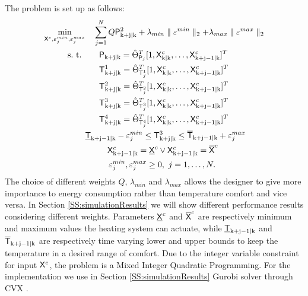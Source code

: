 The problem is set up as follows:
\begin{align}
	\begin{aligned}
		\min_{\tX^c,\eps_j^{min},\eps_j^{max}} & \ \ \ \sum_{j=1}^{N} Q{\tP}_{\mathrm{k+j|k}}^2 +  \lambda_{min}\parallel\eps^{min}\parallel_2 + \lambda_{max}\parallel\eps^{max}\parallel_2 \\
		\text{s.~t. }& \ \ \ \ \ {\tP}_{\mathrm{k+j|k}} =  \hat{\Theta}^{T}_{\tP_j} [ 1,\tX^c_{\mathrm{k|k}},\dots,\tX^c_{\mathrm{k+j-1|k}} ]^T \\
					 & \ \ \ \ \ \tT^1_{\mathrm{k+j|k}} =  \hat{\Theta}^{T}_{\tT^1_j} [ 1,\tX^c_{\mathrm{k|k}},\dots,\tX^c_{\mathrm{k+j-1|k}} ]^T \\
					 & \ \ \ \ \ \tT^2_{\mathrm{k+j|k}} =  \hat{\Theta}^{T}_{\tT^2_j} [ 1,\tX^c_{\mathrm{k|k}},\dots,\tX^c_{\mathrm{k+j-1|k}} ]^T \\
			 	 	 & \ \ \ \ \ \tT^3_{\mathrm{k+j|k}} =  \hat{\Theta}^{T}_{\tT^3_j} [ 1,\tX^c_{\mathrm{k|k}},\dots,\tX^c_{\mathrm{k+j-1|k}} ]^T \\
				 	 & \ \ \ \ \ \tT^4_{\mathrm{k+j|k}} =  \hat{\Theta}^{T}_{\tT^4_j} [ 1,\tX^c_{\mathrm{k|k}},\dots,\tX^c_{\mathrm{k+j-1|k}} ]^T \\					
					 & \underline{\tT}_{\mathrm{k+j-1|k}}-\eps^{min}_j \leq \tT^3_{\mathrm{k+j|k}} \leq \overline{\tT}_{\mathrm{k+j-1|k}} + \eps^{max}_j\\
					 & \ \ \ \ \ \ \ \ \tX^c_{\mathrm{k+j-1|k}} = \underline{\tX}^c \lor \tX^c_{\mathrm{k+j-1|k}} = \overline{\tX}^c\\ 
					 & \ \ \ \ \ \ \ \ \,\eps^{min}_j,\eps^{max}_j \geq 0, \ j = 1,\dots,N.
	\end{aligned}
	\label{E:DPCrealcase}
\end{align}
The choice of different weights $Q$, $\lambda_{min}$ and $\lambda_{max}$ allows the designer to give more importance to energy consumption rather than temperature comfort and vice versa. In Section \ref{SS:simulationResults} we will show different performance results considering different weights. Parameters $\underline{\mathsf{X}}^c$ and $\overline{\mathsf{X}}^c$ are respectively minimum and maximum values the heating system can actuate, while $\underline{\mathsf{T}}_{\mathrm{k+j-1|k}}$ and $\overline{\mathsf{T}}_{\mathrm{k+j-1|k}}$ are respectively time varying lower and upper bounds to keep the temperature in a desired range of comfort. Due to the integer variable constraint for input $\mathsf{X}^c$, the problem is a Mixed Integer Quadratic Programming. For the implementation we use in Section \ref{SS:simulationResults} Gurobi solver \cite{Gurobi2015} through CVX \cite{cvx,gb08}.

